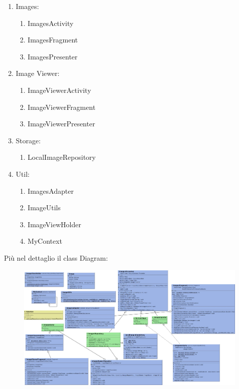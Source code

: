 \documentclass{article}
\begin{document}
\begin{enumerate}
    \item{Images: \begin{enumerate}
        \item ImagesActivity
        \item ImagesFragment
        \item ImagesPresenter
    \end{enumerate}
    }
    \item{Image Viewer: \begin{enumerate}
        \item ImageViewerActivity
        \item ImageViewerFragment
        \item ImageViewerPresenter
    \end{enumerate}
    }
    \newpage
    \item {Storage:\begin{enumerate}
        \item LocalImageRepository
    \end{enumerate}
    }
    \item{Util: \begin{enumerate}
        \item ImagesAdapter
        \item ImageUtils
        \item ImageViewHolder
        \item MyContext
    \end{enumerate}
    }
    
\end{enumerate}
Più nel dettaglio il class Diagram:

\begin{figure}[h!]
    \begin{center}
    \includegraphics[width=180mm]{images/FINAL CLASS DIAGRAM immagine.jpg}
    \end{center}
\end{figure}
\end{document}
